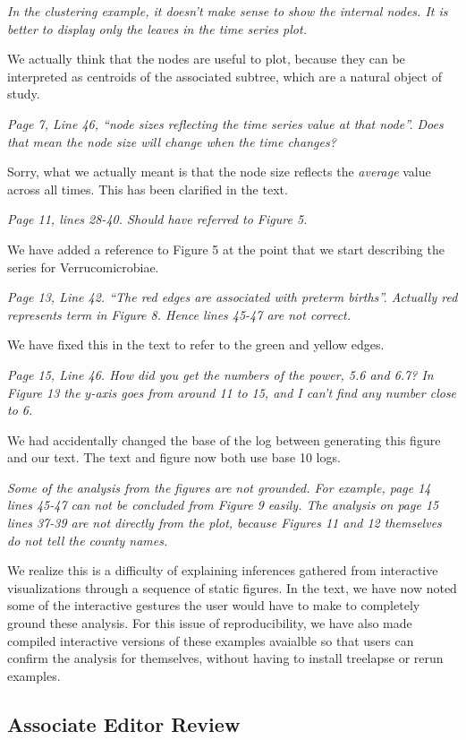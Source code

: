 \documentclass{article}
\begin{document}
\textit{In the clustering example, it doesn't make sense to show the internal
  nodes. It is better to display only the leaves in the time series plot.}

We actually think that the nodes are useful to plot, because they can be
interpreted as centroids of the associated subtree, which are a natural object
of study.

\textit{Page 7, Line 46, ``node sizes reflecting the time series value at that
  node''. Does that mean the node size will change when the time changes?}

Sorry, what we actually meant is that the node size reflects the
\textit{average} value across all times. This has been clarified in the text.

\textit{Page 11, lines 28-40. Should have referred to Figure 5.}

We have added a reference to Figure 5 at the point that we start describing the
series for Verrucomicrobiae.

\textit{Page 13, Line 42. ``The red edges are associated with preterm births''.
  Actually red represents term in Figure 8. Hence lines 45-47 are not correct.}

We have fixed this in the text to refer to the green and yellow edges.

\textit{Page 15, Line 46. How did you get the numbers of the power, 5.6 and 6.7?
  In Figure 13 the $y$-axis goes from around 11 to 15, and I can't find any
  number close to 6.}

We had accidentally changed the base of the log between generating this figure
and our text. The text and figure now both use base 10 logs.

\textit{Some of the analysis from the figures are not grounded. For example,
  page 14 lines 45-47 can not be concluded from Figure 9 easily. The analysis on
  page 15 lines 37-39 are not directly from the plot, because Figures 11 and 12
  themselves do not tell the county names.}

We realize this is a difficulty of explaining inferences gathered from
interactive visualizations through a sequence of static figures. In the text, we
have now noted some of the interactive gestures the user would have to make to
completely ground these analysis. For this issue of reproducibility, we have
also made compiled interactive versions of these examples avaialble so that
users can confirm the analysis for themselves, without having to install
treelapse or rerun examples.

\subsection{Associate Editor Review}
\end{document}
